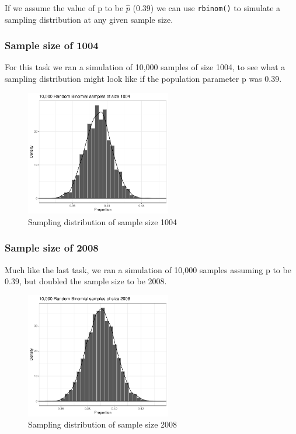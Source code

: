 \documentclass{article}\usepackage[]{graphicx}\usepackage[]{xcolor}
\begin{document}
\begin{multicols}{2}
If we assume the value of p to be $\hat{p}$ (0.39) we can use \texttt{rbinom()} to simulate a sampling distribution at any given sample size.

\subsubsection{Sample size of 1004}

For this task we ran a simulation of 10,000 samples of size 1004, to see what a sampling distribution might look like if the population parameter p was 0.39.

\begin{figure}[H]
\label{p1}
\centering
\includegraphics[width=2.5in]{rbin_1004.pdf}
\caption{Sampling distribution of sample size 1004}
\end{figure}

\subsubsection{Sample size of 2008}

Much like the last task, we ran a simulation of 10,000 samples  assuming p to be 0.39, but doubled the sample size to be 2008.

\begin{figure}[H]
\label{p2}
\centering
\includegraphics[width=2.5in]{rbin_2008.pdf}
\caption{Sampling distribution of sample size 2008}
\end{figure}


\end{multicols}
\end{document}
